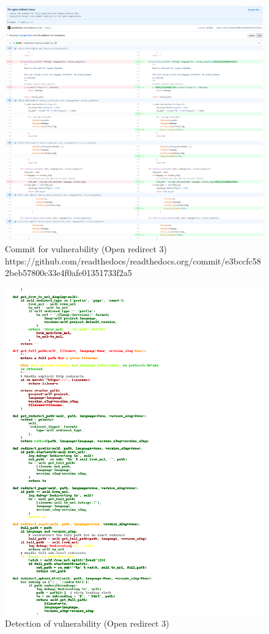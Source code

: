 \documentclass[
a4paper,
pagesize,
pdftex,
12pt,
twoside, %
BCOR=5mm, %
ngerman,
fleqn,
final,
]{scrartcl}
\begin{document}
	
	\begin{figure}[H]
		\centering
		\includegraphics[width=\linewidth]{Images/open_redirectC}
		\caption{Commit for vulnerability (Open redirect 3) \newline \scriptsize{
				https://github.com/readthedocs/readthedocs.org/commit/e3bccfc582beb57800c33e4f0afe01351733f2a5
		}}
		\label{fig:open_redirectC}
	\end{figure}
	\begin{figure}[H]
		\centering
		\includegraphics[width=\linewidth]{Images/open_redirectCr}
		\caption{Detection of vulnerability (Open redirect 3)}
		\label{fig:open_redirectCr}
	\end{figure}
	
\end{document}
